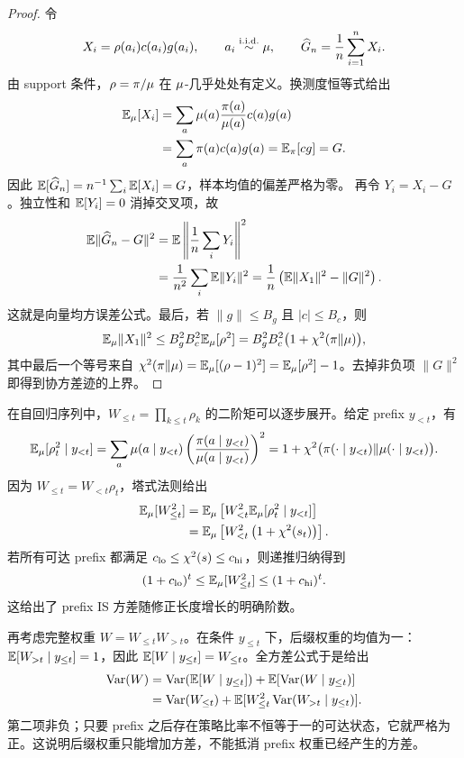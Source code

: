 \begin{proof}
令
\[
X_i=\rho(a_i)c(a_i)g(a_i),
\qquad a_i\stackrel{\mathrm{i.i.d.}}{\sim}\mu,
\qquad \widehat G_n=\frac1n\sum_{i=1}^nX_i.
\]
由 support 条件，$\rho=\pi/\mu$ 在 $\mu$-几乎处处有定义。换测度恒等式给出
\begin{align*}
\mathbb{E}_\mu[X_i]
&=\sum_a\mu(a)\frac{\pi(a)}{\mu(a)}c(a)g(a)\\
&=\sum_a\pi(a)c(a)g(a)=\mathbb{E}_\pi[cg]=G.
\end{align*}
因此
$\mathbb{E}[\widehat G_n]=n^{-1}\sum_i\mathbb{E}[X_i]=G$，样本均值的偏差严格为零。
再令 $Y_i=X_i-G$。独立性和 $\mathbb{E}[Y_i]=0$ 消掉交叉项，故
\begin{align*}
\mathbb{E}\lVert\widehat G_n-G\rVert^2
&=\mathbb{E}\left\lVert\frac1n\sum_iY_i\right\rVert^2\\
&=\frac{1}{n^2}\sum_i\mathbb{E}\lVert Y_i\rVert^2
=\frac1n\left(\mathbb{E}\lVert X_1\rVert^2-\lVert G\rVert^2\right).
\end{align*}
这就是向量均方误差公式。最后，若 $\lVert g\rVert\leq B_g$ 且 $|c|\leq B_c$，则
\[
\mathbb{E}_\mu\lVert X_1\rVert^2
\leq B_g^2B_c^2\mathbb{E}_\mu[\rho^2]
=B_g^2B_c^2\bigl(1+\chi^2(\pi\Vert\mu)\bigr),
\]
其中最后一个等号来自
$\chi^2(\pi\Vert\mu)=\mathbb{E}_\mu[(\rho-1)^2]=\mathbb{E}_\mu[\rho^2]-1$。去掉非负项 $\lVert G\rVert^2$ 即得到协方差迹的上界。
\end{proof}

在自回归序列中，$W_{\leq t}=\prod_{k\leq t}\rho_k$ 的二阶矩可以逐步展开。给定 prefix $y_{<t}$，有
\[
\mathbb{E}_\mu[\rho_t^2\mid y_{<t}]
=\sum_a\mu(a\mid y_{<t})
\left(\frac{\pi(a\mid y_{<t})}{\mu(a\mid y_{<t})}\right)^2
=1+\chi^2\bigl(\pi(\cdot\mid y_{<t})\Vert\mu(\cdot\mid y_{<t})\bigr).
\]
因为 $W_{\leq t}=W_{<t}\rho_t$，塔式法则给出
\begin{align*}
\mathbb{E}_\mu[W_{\leq t}^2]
&=\mathbb{E}_\mu\left[W_{<t}^2\mathbb{E}_\mu[\rho_t^2\mid y_{<t}]\right]\\
&=\mathbb{E}_\mu\left[W_{<t}^2\left(1+\chi^2(s_t)\right)\right].
\end{align*}
若所有可达 prefix 都满足 $c_{\rm lo}\leq\chi^2(s)\leq c_{\rm hi}$，则递推归纳得到
\begin{equation}
(1+c_{\rm lo})^t\leq\mathbb{E}_\mu[W_{\leq t}^2]\leq(1+c_{\rm hi})^t.
\end{equation}
这给出了 prefix IS 方差随修正长度增长的明确阶数。

再考虑完整权重 $W=W_{\leq t}W_{>t}$。在条件 $y_{\leq t}$ 下，后缀权重的均值为一：$\mathbb{E}[W_{>t}\mid y_{\leq t}]=1$，因此
$\mathbb{E}[W\mid y_{\leq t}]=W_{\leq t}$。全方差公式于是给出
\begin{equation}
\label{eq:prefix-total-variance}
\begin{aligned}
\operatorname{Var}(W)
&=\operatorname{Var}(\mathbb{E}[W\mid y_{\leq t}])
 +\mathbb{E}[\operatorname{Var}(W\mid y_{\leq t})]\\
&=\operatorname{Var}(W_{\leq t})
 +\mathbb{E}[W_{\leq t}^2\operatorname{Var}(W_{>t}\mid y_{\leq t})].
\end{aligned}
\end{equation}
第二项非负；只要 prefix 之后存在策略比率不恒等于一的可达状态，它就严格为正。这说明后缀权重只能增加方差，不能抵消 prefix 权重已经产生的方差。


